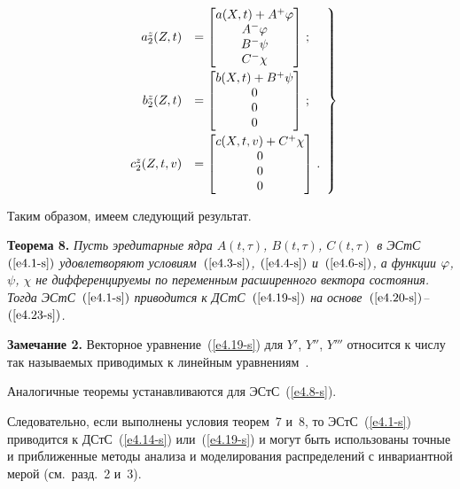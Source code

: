 \begin{multicols}{2}
        \begin{equation}
        \left.
        \begin{array}{rl}
        a_2^z (Z,t)&=\displaystyle\begin{bmatrix}
        a(X,t)+A^+\varphi\\
        A^-\varphi\\
        B^- \psi\\
        C^-\chi\end{bmatrix}\,;\\[21pt]
    b_2^z (Z,t)&=\displaystyle\begin{bmatrix}
        b(X,t)+B^+\psi\\
        0\\
        0\\
        0\end{bmatrix}\,; \\[21pt]
      c_2^z (Z,t,v)&\displaystyle=\begin{bmatrix}
        c(X,t,v)+C^+\chi\\
        0\\
        0\\
        0\end{bmatrix}\,.
        \end{array}
        \right\}
        \label{e4.23-s}
        \end{equation}

Таким образом, имеем следующий результат.

\smallskip

\noindent
\textbf{Теорема 8.} \textit{Пусть эредитарные ядра $A(t,\tau)$,
$B(t,\tau)$, $C(t,\tau)$ в ЭСтС~$(\ref{e4.1-s})$ удовлетворяют условиям~$(\ref{e4.3-s})$,
$(\ref{e4.4-s})$ и~$(\ref{e4.6-s})$, а функции $\varphi$, $\psi$, $\chi$
не дифференцируемы по переменным расширенного вектора состояния.
Тогда ЭСтС~$(\ref{e4.1-s})$ приводится к ДСтС~$(\ref{e4.19-s})$
на основе~$(\ref{e4.20-s})$--$(\ref{e4.23-s})$.}

\smallskip

\noindent
\textbf{Замечание 2.}
Векторное уравнение~(\ref{e4.19-s}) для $Y'$, $Y''$, $Y'''$ относится к
числу так называемых приводимых к линейным уравнениям~\cite{2-s}.

Аналогичные теоремы устанавливаются для ЭСтС~(\ref{e4.8-s}).

Следовательно, если выполнены условия теорем~7 и~8, то ЭСтС~(\ref{e4.1-s})
приводится к ДСтС~(\ref{e4.14-s}) или~(\ref{e4.19-s}) и могут быть использованы
точные и приближенные методы анализа и моделирования распределений с
инвариантной мерой (см.\ разд.~2 и~3).


\end{multicols}
